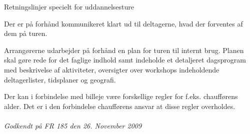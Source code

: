 Retningslinjer specielt for uddannelsesture
\begin{list}{•}
\item Der er på forhånd kommunikeret klart ud til deltagerne, hvad der forventes af dem på turen.
\item Arrangørerne udarbejder på forhånd en plan for turen til internt brug. Planen skal gøre rede for det faglige
indhold samt indeholde et detaljeret dagsprogram med beskrivelse af aktiviteter, oversigter over workshops
indeholdende deltagerlister, tidsplaner og geografi.
\end{list}
Der kan i forbindelse med billeje være forskellige regler for f.eks. chaufførens alder. Det er i den forbindelse
chaufførens ansvar at disse regler overholdes.\\
\\

\textit{Godkendt på FR 185 den 26. November 2009}
